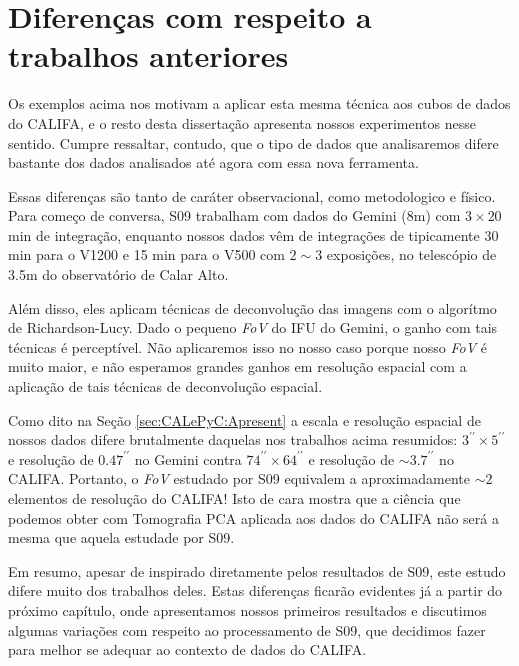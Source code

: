 

\section{Diferen\c{c}as com respeito a trabalhos anteriores}

Os exemplos acima nos motivam a aplicar esta mesma técnica aos cubos de dados do CALIFA, e o resto desta dissertação
apresenta nossos experimentos nesse sentido. Cumpre ressaltar, contudo, que o tipo de dados que analisaremos difere
bastante dos dados analisados até agora com essa nova ferramenta.

Essas diferenças são tanto de caráter observacional, como metodologico e físico. Para começo de conversa, S09 trabalham
com dados do Gemini (8m) com $3 \times 20$ min de integração, enquanto nossos dados vêm de integrações de tipicamente
30 min para o V1200 e 15 min para o V500 com $2\sim3$ exposições, no telescópio de 3.5m do observatório de Calar Alto.

Além disso, eles aplicam técnicas de deconvolução das imagens com o algorítmo de Richardson-Lucy. Dado o pequeno {\em
FoV} do IFU do Gemini, o ganho com tais técnicas é perceptível. Não aplicaremos isso no nosso caso porque nosso {\em
FoV} é muito maior, e não esperamos grandes ganhos em resolução espacial com a aplicação de tais técnicas de
deconvolução espacial.

Como dito na Seção \ref{sec:CALePyC:Apresent} a escala e resolução espacial de nossos dados difere brutalmente daquelas
nos trabalhos acima resumidos: $3^{\prime\prime} \times 5^{\prime\prime}$ e resolução de $0.47^{\prime\prime}$ no Gemini
contra $74^{\prime\prime} \times 64^{\prime\prime}$ e resolução de $\sim3.7^{\prime\prime}$ no CALIFA. Portanto, o {\em
FoV} estudado por S09 equivalem a aproximadamente $\sim2$ elementos de resolução do CALIFA! Isto de cara mostra que a
ciência que podemos obter com Tomografia PCA aplicada aos dados do CALIFA não será a mesma que aquela estudade por S09.

Em resumo, apesar de inspirado diretamente pelos resultados de S09, este estudo difere muito dos trabalhos deles. Estas
diferenças ficarão evidentes já a partir do próximo capítulo, onde apresentamos nossos primeiros resultados e discutimos
algumas variações com respeito ao processamento de S09, que decidimos fazer para melhor se adequar ao contexto de dados
do CALIFA.

